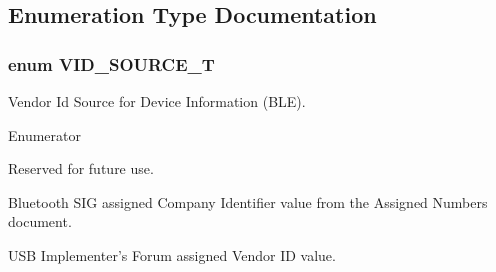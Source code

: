 \subsection{Enumeration Type Documentation}
\hypertarget{group___enumerations_ga42b352f4817787f82d2adcffd4793ad9}{
\subsubsection[{V\-I\-D\-\_\-\-S\-O\-U\-R\-C\-E\-\_\-\-T}]{\setlength{\rightskip}{0pt plus 5cm}enum {\bf V\-I\-D\-\_\-\-S\-O\-U\-R\-C\-E\-\_\-\-T}}}\label{group___enumerations_ga42b352f4817787f82d2adcffd4793ad9}
Vendor Id Source for Device Information (B\-L\-E). \begin{Desc}
\item[Enumerator]\par
\begin{description}
\item[{\em 
\hypertarget{group___enumerations_gga42b352f4817787f82d2adcffd4793ad9abb49a7689b3186fe7da6b61eeb6a207d}{V\-S\-\_\-\-R\-E\-V}\label{group___enumerations_gga42b352f4817787f82d2adcffd4793ad9abb49a7689b3186fe7da6b61eeb6a207d}
}]Reserved for future use. \item[{\em 
\hypertarget{group___enumerations_gga42b352f4817787f82d2adcffd4793ad9aee983b596859c3b849a073596459d38c}{V\-S\-\_\-\-S\-I\-G}\label{group___enumerations_gga42b352f4817787f82d2adcffd4793ad9aee983b596859c3b849a073596459d38c}
}]Bluetooth S\-I\-G assigned Company Identifier value from the Assigned Numbers document. \item[{\em 
\hypertarget{group___enumerations_gga42b352f4817787f82d2adcffd4793ad9a704d8d311290a7c789e3902af79ae043}{V\-S\-\_\-\-U\-S\-B}\label{group___enumerations_gga42b352f4817787f82d2adcffd4793ad9a704d8d311290a7c789e3902af79ae043}
}]U\-S\-B Implementer’s Forum assigned Vendor I\-D value. \end{description}
\end{Desc}
